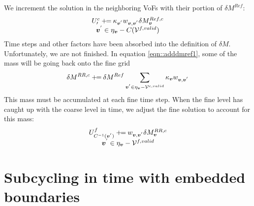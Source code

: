 We increment the solution in the neighboring VoFs with their portion
of $\delta M^{Ref}$:
\begin{equation}
\begin{array}{c}
U^{c}_{\prime} \mathbin{+\mkern-7mu=} \kappa_{{\boldsymbol{v}^{'}}} 
w_{{\boldsymbol{v}},{\boldsymbol{v}^{'}}} \delta M^{Ref,c}_{{\boldsymbol{v}}} \\
{{\boldsymbol{v}^{'}}} \in {\eta}_{{\boldsymbol{v}}} -  C({{\cal V}^{f, valid}})
\end{array}
\label{eqn::adddmref1}
\end{equation}
Time steps and other factors have  been absorbed into the 
definition of $\delta M$.   Unfortunately, we are not finished.
In equation \ref{eqn::adddmref1}, some of the mass will be going back onto
the fine grid
\begin{equation}
\delta M^{RR,c} \mathbin{+\mkern-7mu=}
\delta M^{Ref} \sum\limits_{{{\boldsymbol{v}^{'}}} \in {\eta}_{{\boldsymbol{v}}} - {{\cal V}^{c,
valid}}} 
 \kappa_{{\boldsymbol{v}}} w_{{\boldsymbol{v}},{\boldsymbol{v}^{'}}} 
\end{equation}
This mass must be accumulated at each fine time step.  When 
the fine level has caught up with the coarse level in time,
we adjust the fine solution to account for this mass:
\begin{equation}
\begin{array}{c}
U^{f}_{C^{-1}({\boldsymbol{v}^{'}})} \mathbin{+\mkern-7mu=} 
w_{{\boldsymbol{v}},{\boldsymbol{v}^{'}}} \delta M^{RR,c}_{{\boldsymbol{v}}} \\
{{\boldsymbol{v}^{'}}} \in {\eta}_{{\boldsymbol{v}}} - {{\cal V}^{f, valid}}
\end{array}
\label{eqn::adddmref2}
\end{equation}

\section{Subcycling in time with embedded boundaries}

